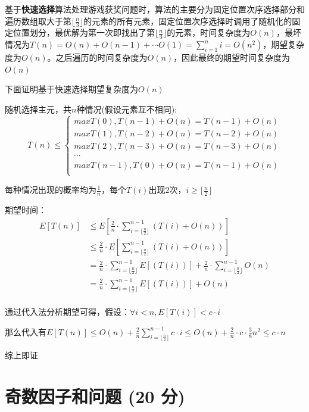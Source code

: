\documentclass{article}
\begin{document}
基于\textbf{快速选择}算法处理游戏获奖问题时，算法的主要分为固定位置次序选择部分和遍历数组取大于第$\lfloor \frac{n}{3}\rfloor$的元素的所有元素，固定位置次序选择时调用了随机化的固定位置划分，最优解为第一次即找出了第$\lfloor \frac{n}{3}\rfloor$的元素，时间复杂度为$O(n)$，最坏情况为$T(n) = O(n) + O(n-1)+\cdots O(1) = \sum_{i=1}^n i = O(n^2)$，期望复杂度为$O(n)$。之后遍历的时间复杂度为$O(n)$，因此最终的期望时间复杂度为$O(n)$

下面证明基于快速选择期望复杂度为$O(n)$

随机选择主元，共$n$种情况(假设元素互不相同):
$$
T(n) \le
\begin{cases}
max{T(0), T(n-1)} + O(n)= T(n-1) + O(n)\\    
max{T(1), T(n-2)} + O(n)= T(n-2) + O(n)\\    
max{T(2), T(n-3)} + O(n)= T(n-3) + O(n)\\    
\cdots \\
max{T(n-1), T(0)} + O(n)= T(n-1) + O(n)\\    
\end{cases}
$$

每种情况出现的概率均为$\frac{1}{n}$，每个$T(i)出现2次，i\ge \lfloor \frac{n}{2} \rfloor$

期望时间：
\begin{align*}    
E[T(n)]&\le E[\frac{2}{n} \cdot \sum_{i=\lfloor \frac{n}{2} \rfloor}^{n-1} (T(i) + O(n))] \\
&\le\frac{2}{n} \cdot E[ \sum_{i=\lfloor \frac{n}{2} \rfloor}^{n-1} (T(i) + O(n))]\\
&=\frac{2}{n} \cdot  \sum_{i=\lfloor \frac{n}{2} \rfloor}^{n-1} E[(T(i))] + \frac{2}{n}\cdot  \sum_{i=\lfloor \frac{n}{2} \rfloor}^{n-1} O(n)\\
&=\frac{2}{n} \cdot  \sum_{i=\lfloor \frac{n}{2} \rfloor}^{n-1} E[(T(i))] + O(n)\\
\end{align*}

通过代入法分析期望可得，假设：$\forall i < n, E[T(i)] < c \cdot i$

那么代入有$E[T(n)]\le O(n) + \frac{2}{n} \sum_{i=\lfloor \frac{n}{2} \rfloor}^{n-1} c\cdot i\le O(n) + \frac{2}{n}\cdot c\cdot \frac{3}{8}n^2\le c \cdot n$

综上即证


\section{奇数因子和问题 (20 分)} %
\end{document}
